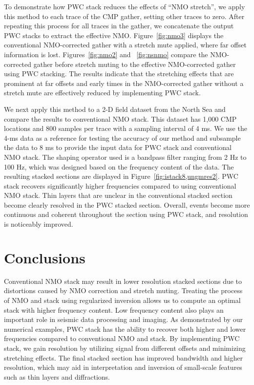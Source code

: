 To demonstrate how PWC stack reduces the effects of ``NMO stretch'', we apply this method to 
each trace of the CMP gather, setting other traces to zero. After repeating this process 
for all traces in the gather, we concatenate the output PWC stacks to extract the effective NMO. 
Figure~\ref{fig:nmo3} displays the conventional NMO-corrected gather with a stretch mute applied, 
where far offset information is lost. Figures~\ref{fig:nmo2} and ~\ref{fig:nsnmo} compare  
the NMO-corrected gather before stretch muting to the effective NMO-corrected gather using PWC stacking. 
The results indicate that the stretching effects that are prominent at far offsets and early times in the NMO-corrected gather 
without a stretch mute are effectively reduced by implementing PWC stack.


We next apply this method to a 2-D field dataset from the North Sea and compare the results to conventional NMO stack. 
This dataset has 1,000 CMP locations and 800 samples per trace with a sampling interval of 4 ms. 
We use the 4-ms data as a reference for testing the accuracy of our method and subsample the data to 8 ms 
to provide the input data for PWC stack and conventional NMO stack. The shaping operator used is a bandpass filter 
ranging from 2 Hz to 100 Hz, which was designed based on the frequency content of the data. 
The resulting stacked sections are displayed in Figure~\ref{fig:istack8,ungmres2}. 
PWC stack recovers significantly higher frequencies compared to using conventional NMO stack. 
Thin layers that are unclear in the conventional stacked section become clearly resolved 
in the PWC stacked section. Overall, events become more continuous and coherent throughout the section 
using PWC stack, and resolution is noticeably improved. 

\section{Conclusions}
Conventional NMO stack may result in lower resolution stacked sections due to distortions caused 
by NMO correction and stretch muting. Treating the process of NMO and stack using regularized inversion 
allows us to compute an optimal stack with higher frequency content. Low frequency content also plays
an important role in seismic data processing and imaging. As demonstrated by our numerical examples, 
PWC stack has the ability to recover both higher and lower frequencies compared to conventional NMO and stack.
By implementing PWC stack, we gain resolution by utilizing signal from different offsets 
and minimizing stretching effects.
The final stacked section has improved bandwidth and higher resolution, which may aid in interpretation 
and inversion of small-scale features such as thin layers and diffractions.   

